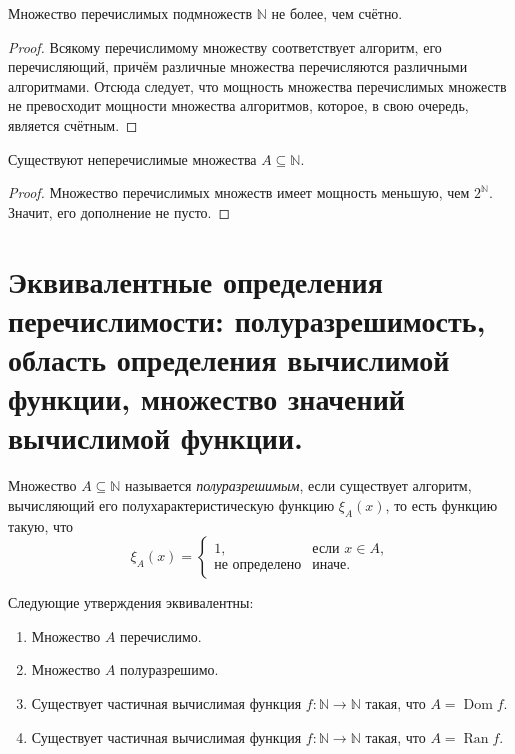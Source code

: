 \documentclass{article}
\begin{document}
    \begin{statement}
        Множество перечислимых подмножеств $\mathbb{N}$ не более, чем счётно.
    \end{statement}
    \begin{proof}
        Всякому перечислимому множеству соответствует алгоритм, его перечисляющий, причём различные множества
        перечисляются различными алгоритмами. Отсюда следует, что мощность множества перечислимых множеств не
        превосходит мощности множества алгоритмов, которое, в свою очередь, является счётным.
    \end{proof}

    \begin{theorem}
        Существуют неперечислимые множества $A \subseteq \mathbb{N}$.
    \end{theorem}
    \begin{proof}
        Множество перечислимых множеств имеет мощность меньшую, чем $2^\mathbb{N}$. Значит, его дополнение
        не пусто.
    \end{proof}

    \section{Эквивалентные определения перечислимости: полуразрешимость, область определения
    вычислимой функции, множество значений вычислимой функции.}

    \begin{definition}
        Множество $A \subseteq \mathbb{N}$ называется \textit{полуразрешимым}, если существует алгоритм,
        вычисляющий его полухарактеристическую функцию $\xi_A(x)$, то есть функцию такую, что
        $$
            \xi_A(x) =
            \begin{cases}
                1, & \text{если $x \in A$,}\\
                \text{не определено} & \text{иначе.}
            \end{cases}
        $$
    \end{definition}

    \begin{theorem}
        Следующие утверждения эквивалентны:
        \begin{enumerate}
            \item Множество $A$ перечислимо.
            \item Множество $A$ полуразрешимо.
            \item Существует частичная вычислимая функция $f: \mathbb{N} \to \mathbb{N}$ такая, что
                $A = \operatorname{Dom} f$.
            \item Существует частичная вычислимая функция $f: \mathbb{N} \to \mathbb{N}$ такая, что
                $A = \operatorname{Ran} f$.
        \end{enumerate}
    \end{theorem}
\end{document}
